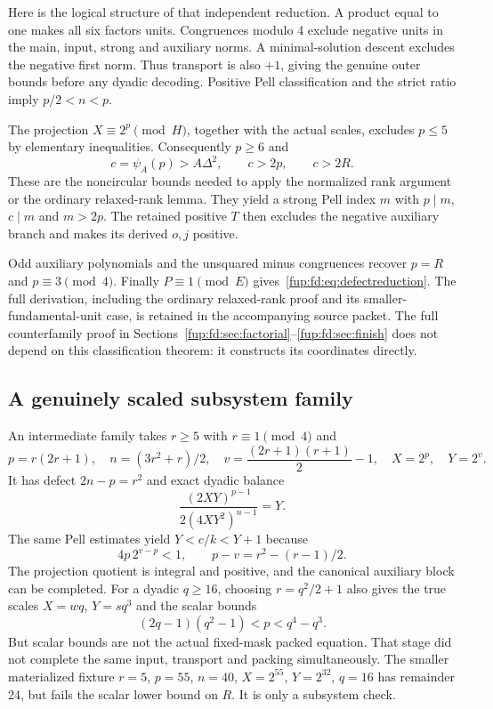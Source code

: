 \documentclass[11pt,letterpaper]{article}
\theoremstyle{definition}\newtheorem{definition}[theorem]{Definition}
\theoremstyle{remark}\newtheorem{remark}[theorem]{Remark}
\begin{document}
Here is the logical structure of that independent reduction. A product equal to one makes all six factors units. Congruences modulo 4 exclude negative units in the main, input, strong and auxiliary norms. A minimal-solution descent excludes the negative first norm. Thus transport is also $+1$, giving the genuine outer bounds before any dyadic decoding. Positive Pell classification and the strict ratio imply $p/2<n<p$.

The projection $X\equiv2^p\pmod H$, together with the actual scales, excludes $p\le5$ by elementary inequalities. Consequently $p\ge6$ and
\[
 c=\psi_A(p)>A\Delta^2,\qquad c>2p,\qquad c>2R.
\]
These are the noncircular bounds needed to apply the normalized rank argument or the ordinary relaxed-rank lemma. They yield a strong Pell index $m$ with $p\mid m$, $c\mid m$ and $m>2p$. The retained positive $T$ then excludes the negative auxiliary branch and makes its derived $o,j$ positive.

Odd auxiliary polynomials and the unsquared minus congruences recover $p=R$ and $p\equiv3\pmod4$. Finally $P\equiv1\pmod E$ gives~\eqref{fup:fd:eq:defectreduction}. The full derivation, including the ordinary relaxed-rank proof and its smaller-fundamental-unit case, is retained in the accompanying source packet. The full counterfamily proof in Sections~\ref{fup:fd:sec:factorial}--\ref{fup:fd:sec:finish} does not depend on this classification theorem: it constructs its coordinates directly.

\subsection{A genuinely scaled subsystem family}
An intermediate family takes $r\ge5$ with $r\equiv1\pmod4$ and
\[
 p=r(2r+1),\quad n=(3r^2+r)/2,\quad
 v=\frac{(2r+1)(r+1)}2-1,\quad X=2^p,\quad Y=2^v.
\]
It has defect $2n-p=r^2$ and exact dyadic balance
\[
 \frac{(2XY)^{p-1}}{2(4XY^2)^{n-1}}=Y.
\]
The same Pell estimates yield $Y<c/k<Y+1$ because
\[
 4p\,2^{v-p}<1,
 \qquad p-v=r^2-(r-1)/2.
\]
The projection quotient is integral and positive, and the canonical auxiliary block can be completed. For a dyadic $q\ge16$, choosing $r=q^2/2+1$ also gives the true scales $X=wq$, $Y=sq^3$ and the scalar bounds
\[
 (2q-1)(q^2-1)<p<q^4-q^3.
\]
But scalar bounds are not the actual fixed-mask packed equation. That stage did not complete the same input, transport and packing simultaneously. The smaller materialized fixture $r=5$, $p=55$, $n=40$, $X=2^{55}$, $Y=2^{32}$, $q=16$ has remainder 24, but fails the scalar lower bound on $R$. It is only a subsystem check.
\end{document}
